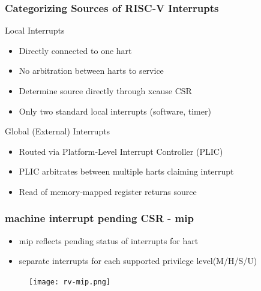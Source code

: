 \begin{frame}[fragile]
    \frametitle{Categorizing	
 Sources	
 of	
 RISC‐V	
 Interrupts	
 }
Local	
 Interrupts	
  
    \begin{itemize}
    \item  Directly	connected	 to	 one	 hart	
    \item  No	 arbitration	 between	 harts	 to	 service	
    \item Determine	
 source	
 directly	
 through	
 xcause	
 CSR	
  
    \item  Only	 two	 standard	 local	 interrupts	 (software,	 timer)	
      
\end{itemize}
Global	
 (External)	
 Interrupts	
  
    \begin{itemize}
    \item  Routed	 via	 Platform‐Level	 Interrupt	 Controller	 (PLIC)	
    \item  PLIC	 arbitrates	 between	 multiple	 harts	 claiming	 interrupt	
    \item Read	 of	 memory‐mapped	 register	 returns	 source    
\end{itemize}
\end{frame}
% 
% 
\begin{frame}[fragile]
    \frametitle{machine interrupt pending CSR - mip}
    \begin{itemize}
    \item  mip reflects pending status of interrupts for hart
    \item  separate interrupts for each supported privilege level(M/H/S/U)	  
\end{itemize}
    \begin{figure}
    \texttt{[image: rv-mip.png]}
    \end{figure}
\end{frame}
% 
% 
